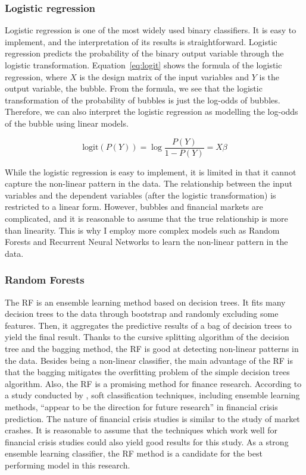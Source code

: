 \documentclass[12pt, man, a4paper, floatsintext]{apa7}
\begin{document}
\subsubsection{Logistic regression}

Logistic regression is one of the most widely used binary classifiers. It is easy to implement, and the interpretation of its results is straightforward. Logistic regression predicts the probability of the binary output variable through the logistic transformation. Equation~\ref{eq:logit} shows the formula of the logistic regression, where $X$ is the design matrix of the input variables and $Y$ is the output variable, the bubble. From the formula, we see that the logistic transformation of the probability of bubbles is just the log-odds of bubbles. Therefore, we can also interpret the logistic regression as modelling the log-odds of the bubble using linear models. 

\begin{equation}
    \text{logit}(P(Y)) = \log{\frac{P(Y)}{1-P(Y)}} = X \beta
    \label{eq:logit}
\end{equation}

While the logistic regression is easy to implement, it is limited in that it cannot capture the non-linear pattern in the data. The relationship between the input variables and the dependent variables (after the logistic transformation) is restricted to a linear form. However, bubbles and financial markets are complicated, and it is reasonable to assume that the true relationship is more than linearity. This is why I employ more complex models such as Random Forests and Recurrent Neural Networks to learn the non-linear pattern in the data.

\subsubsection{Random Forests}

The RF is an ensemble learning method based on decision trees. It fits many decision trees to the data through bootstrap and randomly excluding some features. Then, it aggregates the predictive results of a bag of decision trees to yield the final result. Thanks to the cursive splitting algorithm of the decision tree and the bagging method, the RF is good at detecting non-linear patterns in the data. Besides being a non-linear classifier, the main advantage of the RF is that the bagging mitigates the overfitting problem of the simple decision trees algorithm. Also, the RF is a promising method for finance research. According to a study conducted by \textcite{LinSurvey}, soft classification techniques, including ensemble learning methods, “appear to be the direction for future research” in financial crisis prediction. The nature of financial crisis studies is similar to the study of market crashes. It is reasonable to assume that the techniques which work well for financial crisis studies could also yield good results for this study. As a strong ensemble learning classifier, the RF method is a candidate for the best performing model in this research.
\end{document}
